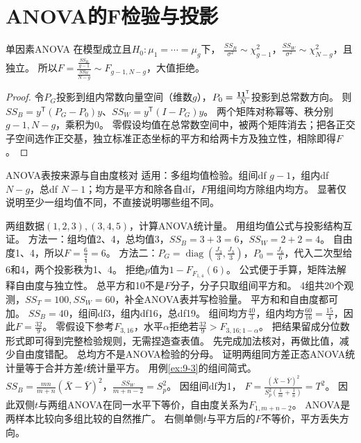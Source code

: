 \section{ANOVA的F检验与投影}\label{sec:92}
\begin{theorem}{单因素ANOVA}
在模型成立且$H_0:\mu_1=\cdots=\mu_g$下，
$\frac{SS_B}{\sigma^2}\sim\chi_{g-1}^2$，$\frac{SS_W}{\sigma^2}\sim\chi_{N-g}^2$，且独立。
所以$F=\frac{\frac{SS_B}{g-1}}{\frac{SS_W}{N-g}}\sim F_{g-1,N-g}$，大值拒绝。
\end{theorem}
\begin{proof}
令$P_G$投影到组内常数向量空间（维数$g$），$P_0=\frac{\mathbf1\mathbf1^\mathsf T}{N}$投影到总常数方向。
则$SS_B=y^\mathsf T(P_G-P_0)y$、$SS_W=y^\mathsf T(I-P_G)y$。
两个矩阵对称幂等、秩分别$g-1,N-g$，乘积为0。
零假设均值在总常数空间中，被两个矩阵消去；把各正交子空间选作正交基，独立标准正态坐标的平方和给两卡方及独立性，相除即得$F$。
\end{proof}
\begin{method}{ANOVA表按来源与自由度核对}
适用：多组均值检验。组间df $g-1$，组内df $N-g$，总df $N-1$；均方是平方和除各自df，$F$用组间均方除组内均方。
显著仅说明至少一组均值不同，不直接说明哪些组不同。
\end{method}
{两组数据$(1,2,3),(3,4,5)$，计算ANOVA统计量。}
{用组均值公式与投影结构互证。}
{方法一：组均值2、4，总均值3，$SS_B=3+3=6$，$SS_W=2+2=4$。
自由度1、4，所以$F=\frac{6}{\frac{4}{4}}=6$。
方法二：$P_G=\operatorname{diag}(\frac{J_3}{3},\frac{J_3}{3})$，$P_0=\frac{J_6}{6}$，代入二次型给6和4，两个投影秩为1、4。
拒绝$p$值为$1-F_{F_{1,4}}(6)$。}
{公式便于手算，矩阵法解释自由度与独立性。}
{总平方和10不是$F$分子，分子只取组间平方和。}
{4组共20个观测，$SS_T=100,SS_W=60$，补全ANOVA表并写检验量。}
{平方和和自由度都可加。}
{$SS_B=40$，组间df3，组内df16，总df19。
组间均方$\frac{40}{3}$，组内均方$\frac{60}{16}=\frac{15}{4}$，因此$F=\frac{32}{9}$。
零假设下参考$F_{3,16}$，水平$\alpha$拒绝若$\frac{32}{9}>F_{3,16;1-\alpha}$。
把结果留成分位数形式即可得到完整检验规则，无需捏造查表值。}
{先完成加法核对，再做比值，减少自由度错配。}
{总均方不是ANOVA检验的分母。}
{证明两组同方差正态ANOVA统计量等于合并方差$t$统计量平方。}
{用例\ref{ex:9-3}的组间简式。}
{$SS_B=\frac{mn}{m+n}(\bar X-\bar Y)^2$，$\frac{SS_W}{m+n-2}=S_p^2$。
因组间df为1，
$F=\frac{(\bar X-\bar Y)^2}{S_p^2(\frac{1}{m}+\frac{1}{n})}=T^2$。
因此双侧$t$与两组ANOVA在同一水平下等价，自由度关系为$F_{1,m+n-2}$。}
{ANOVA是两样本比较向多组比较的自然推广。}
{右侧单侧$t$与平方后的$F$不等价，平方丢失方向。}

